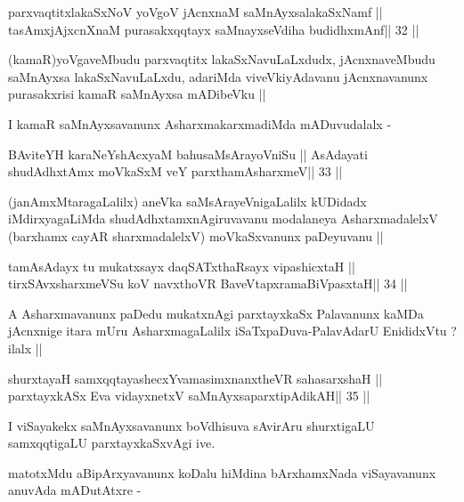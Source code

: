 \begin{shl}
parxvaqtitxlakaSxNoV yoVgoV jAcnxnaM saMnAyxsalakaSxNamf ||
tasAmxjAjxcnXnaM purasakxqqtayx saMnayxseVdiha budidhxmAnf\hfill || 32 ||
\end{shl}

\begin{artha}
(kamaR)yoVgaveMbudu parxvaqtitx lakaSxNavuLaLxdudx, jAcnxnaveMbudu
  saMnAyxsa lakaSxNavuLaLxdu, adariMda viveVkiyAdavanu jAcnxnavanunx
  purasakxrisi kamaR saMnAyxsa mADibeVku || 

I kamaR saMnAyxsavanunx AsharxmakarxmadiMda mADuvudalalx -
\end{artha}

\begin{shl}
BAviteYH karaNeYshAcxyaM bahusaMsArayoVniSu ||
AsAdayati shudAdhxtAmx moVkaSxM veY parxthamAsharxmeV\hfill || 33 ||
\end{shl}

\begin{artha}
(janAmxMtaragaLalilx) aneVka saMsArayeVnigaLalilx kUDidadx
  iMdirxyagaLiMda shudAdhxtamxnAgiruvavanu modalaneya AsharxmadalelxV
  (barxhamx cayAR sharxmadalelxV) moVkaSxvanunx paDeyuvanu ||
\end{artha}

\begin{shl}
tamAsAdayx tu mukatxsayx daqSATxthaRsayx vipashicxtaH ||
tirxSAvxsharxmeVSu koV navxthoVR BaveVtapxramaBiVpasxtaH\hfill || 34 ||
\end{shl}

\begin{artha}
A Asharxmavanunx paDedu mukatxnAgi parxtayxkaSx Palavanunx kaMDa
jAcnxnige itara mUru AsharxmagaLalilx iSaTxpaDuva-PalavAdarU
EnididxVtu ? ilalx ||
\end{artha}

\begin{shl}
shurxtayaH samxqqtayashecxYvamasimxnanxtheVR sahasarxshaH ||
parxtayxkASx Eva vidayxnetxV saMnAyxsaparxtipAdikAH\hfill || 35 ||
\end{shl}

\begin{artha}
I viSayakekx saMnAyxsavanunx boVdhisuva sAvirAru shurxtigaLU
samxqqtigaLU parxtayxkaSxvAgi ive.
\end{artha}

\begin{artha}
matotxMdu aBipArxyavanunx koDalu hiMdina bArxhamxNada viSayavanunx
anuvAda mADutAtxre -
\end{artha}

